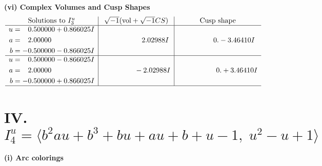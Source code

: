 \documentclass[1p]{elsarticle_modified}
\theoremstyle{definition}
\newcommand{\I}{\sqrt{-1}}
\begin{document}
\newpage\flushleft \textbf{(vi) Complex Volumes and Cusp Shapes}
$$\begin{array}{c|c|c}  
\text{Solutions to }I^u_{3}& \I (\text{vol} + \sqrt{-1}CS) & \text{Cusp shape}\\
 \hline 
\begin{aligned}
u &= \phantom{-}0.500000 + 0.866025 I \\
a &= \phantom{-}2.00000\phantom{ +0.000000I} \\
b &= -0.500000 - 0.866025 I\end{aligned}
 & \phantom{-0.000000 -}2.02988 I & \phantom{-0.000000 } 0. - 3.46410 I \\ \hline\begin{aligned}
u &= \phantom{-}0.500000 - 0.866025 I \\
a &= \phantom{-}2.00000\phantom{ +0.000000I} \\
b &= -0.500000 + 0.866025 I\end{aligned}
 & \phantom{-0.000000 } -2.02988 I & \phantom{-0.000000 -}0. + 3.46410 I\\
 \hline 
 \end{array}$$\newpage\newpage\renewcommand{\arraystretch}{1}
\centering \section*{IV. $I^u_{4}= \langle b^2 a u+b^3+b u+a u+b+u-1,\;u^2- u+1 \rangle$}
\flushleft \textbf{(i) Arc colorings}\\
\end{document}
